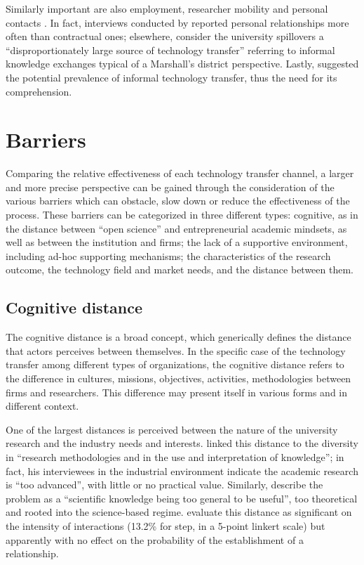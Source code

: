 Similarly important are also employment, researcher mobility and personal contacts \citep{Bekkers2008}. In fact, interviews conducted by \citet{Siegel2003a} reported personal relationships more often than contractual ones; elsewhere, \citet{Sohn2012} consider the university spillovers a \enquote{disproportionately large source of technology transfer} referring to informal knowledge exchanges typical of a Marshall's district perspective. Lastly, \citet{Link2007} suggested the potential prevalence of informal technology transfer, thus the need for its comprehension. 

\section{Barriers} 

Comparing the relative effectiveness of each technology transfer channel, a larger and more precise perspective can be gained through the consideration of the various barriers which can obstacle, slow down or reduce the effectiveness of the process. These barriers can be categorized in three different types: cognitive, as in the distance between \enquote{open science} and entrepreneurial academic mindsets, as well as between the institution and firms; the lack of a supportive environment, including ad-hoc supporting mechanisms; the characteristics of the research outcome, the technology field and market needs, and the distance between them.

\subsection{Cognitive distance} 

The cognitive distance is a broad concept, which generically defines the distance that actors perceives between themselves. In the specific case of the technology transfer among different types of organizations, the cognitive distance refers to the difference in cultures, missions, objectives, activities, methodologies between firms and researchers. This difference may present itself in various forms and in different context.

One of the largest distances is perceived between the nature of the university research and the industry needs and interests. \citet{Muscio2008} linked this distance to the diversity in \enquote{research methodologies and in the use and interpretation of knowledge}; in fact, his interviewees in the industrial environment indicate the academic research is \enquote{too advanced}, with little or no practical value. Similarly, \citet{Gilsing2011} describe the problem as a \enquote{scientific knowledge being too general to be useful}, too theoretical and rooted into the science-based regime. \citet{Muscio2013} evaluate this distance as significant on the intensity of interactions (13.2\% for step, in a 5-point linkert scale) but apparently with no effect on the probability of the establishment of a relationship.

